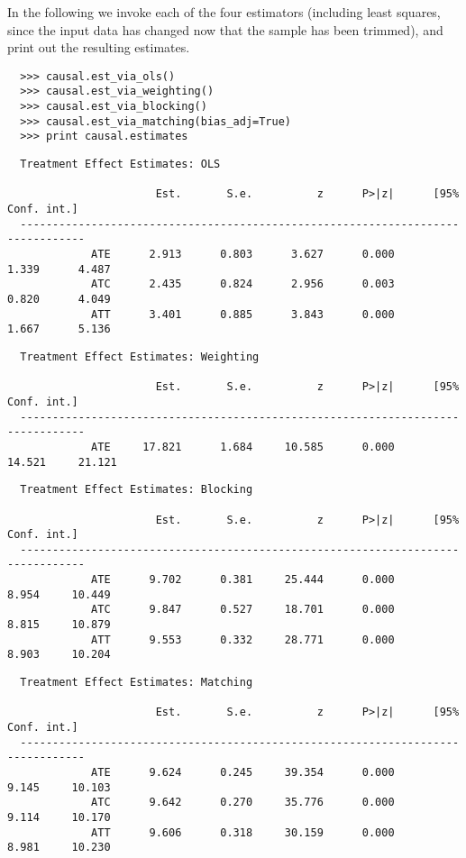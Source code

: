 \documentclass[12pt]{article}
\theoremstyle{definition}
\theoremstyle{definition}
\theoremstyle{definition}
\theoremstyle{remark}
\begin{document}
In the following we invoke each of the four estimators (including least squares, since the input data has changed now that the sample has been trimmed), and print out the resulting estimates.
\begin{verbatim}
  >>> causal.est_via_ols()
  >>> causal.est_via_weighting()
  >>> causal.est_via_blocking()
  >>> causal.est_via_matching(bias_adj=True)
  >>> print causal.estimates
\end{verbatim}
\begin{verbatim}
  Treatment Effect Estimates: OLS
  
                       Est.       S.e.          z      P>|z|      [95% Conf. int.]
  --------------------------------------------------------------------------------
             ATE      2.913      0.803      3.627      0.000      1.339      4.487
             ATC      2.435      0.824      2.956      0.003      0.820      4.049
             ATT      3.401      0.885      3.843      0.000      1.667      5.136
\end{verbatim}
\begin{verbatim}
  Treatment Effect Estimates: Weighting
  
                       Est.       S.e.          z      P>|z|      [95% Conf. int.]
  --------------------------------------------------------------------------------
             ATE     17.821      1.684     10.585      0.000     14.521     21.121
\end{verbatim}
\begin{verbatim}
  Treatment Effect Estimates: Blocking
  
                       Est.       S.e.          z      P>|z|      [95% Conf. int.]
  --------------------------------------------------------------------------------
             ATE      9.702      0.381     25.444      0.000      8.954     10.449
             ATC      9.847      0.527     18.701      0.000      8.815     10.879
             ATT      9.553      0.332     28.771      0.000      8.903     10.204
\end{verbatim}
\begin{verbatim}
  Treatment Effect Estimates: Matching
  
                       Est.       S.e.          z      P>|z|      [95% Conf. int.]
  --------------------------------------------------------------------------------
             ATE      9.624      0.245     39.354      0.000      9.145     10.103
             ATC      9.642      0.270     35.776      0.000      9.114     10.170
             ATT      9.606      0.318     30.159      0.000      8.981     10.230
\end{verbatim}
\end{document}
